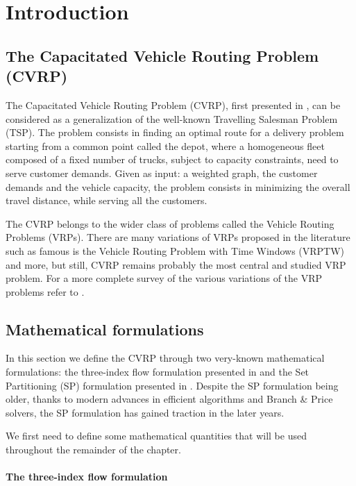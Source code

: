 \chapter{Introduction}

\section{The Capacitated Vehicle Routing Problem (CVRP)}

The Capacitated Vehicle Routing Problem (CVRP), first presented in \cite{dantzig1959truck},
can be considered as a generalization of
the well-known Travelling Salesman Problem (TSP).
The problem consists in finding an optimal route for a delivery problem
starting from a common point called the depot,
where a homogeneous fleet composed of a fixed number of trucks, subject to capacity constraints,
need to serve customer demands.
Given as input: a weighted graph, the customer demands and the vehicle capacity,
the problem consists in minimizing the overall travel distance,
while serving all the customers.

The CVRP belongs to the wider class of problems called the Vehicle Routing Problems (VRPs).
There are many variations of VRPs proposed in the literature such as
famous is the Vehicle Routing Problem with Time Windows (VRPTW) and more, but still, CVRP remains
probably the most central and studied VRP problem.
For a more complete survey of the various variations of the VRP problems refer to \cite{poggi2014chapter}.

\section{Mathematical formulations}

In this section we define the CVRP through two very-known mathematical formulations:
the three-index flow formulation presented in \cite{toth_vehicle_2002} and
the Set Partitioning (SP) formulation presented in \cite{balinski1964integer}.
Despite the SP formulation being older, thanks to modern advances in efficient
algorithms and Branch \& Price solvers, the SP formulation has gained traction in the later years.


We first need to define some mathematical quantities that will be used throughout
the remainder of the chapter.

\subsubsection{The three-index flow formulation}

